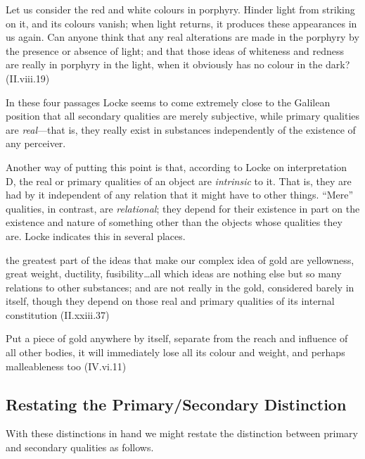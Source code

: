 \documentclass[12pt]{article}
\begin{document}
\begin{quote-b}
Let us consider the red and white colours in porphyry. Hinder light
from striking on it, and its colours vanish; when light returns, it
produces these appearances in us again. Can anyone think that any real
alterations are made in the porphyry by the presence or absence of
light; and that those ideas of whiteness and redness are really in
porphyry in the light, when it obviously has no colour in the dark?
(II.viii.19)
\end{quote-b}

In these four passages Locke seems to come extremely close to the
Galilean position that all secondary qualities are merely subjective,
while primary qualities are \emph{real}---that is, they really exist in
substances independently of the existence of any perceiver.

Another way of putting this point is that, according to Locke on
interpretation D, the real or primary qualities of an object are
\emph{intrinsic} to it. That is, they are had by it independent of any
relation that it might have to other things. ``Mere'' qualities, in
contrast, are \emph{relational}; they depend for their existence in part on
the existence and nature of something other than the objects whose
qualities they are. Locke indicates this in several places.

\begin{quote-b}
the greatest part of the ideas that make our complex idea of gold are
yellowness, great weight, ductility, fusibility\ldots{}all which ideas are
nothing else but so many relations to other substances; and are not
really in the gold, considered barely in itself, though they depend on
those real and primary qualities of its internal constitution
(II.xxiii.37)
\end{quote-b}

\begin{quote-b}
Put a piece of gold anywhere by itself, separate from the reach and
influence of all other bodies, it will immediately lose all its colour
and weight, and perhaps malleableness too (IV.vi.11)
\end{quote-b}

\subsection{Restating the Primary/Secondary Distinction}
\label{sec:orgb5fecc3}
With these distinctions in hand we might restate the distinction between
primary and secondary qualities as follows.
\end{document}
